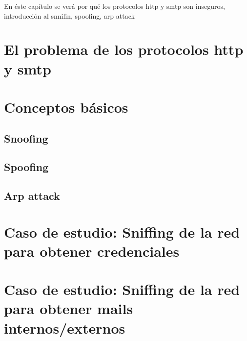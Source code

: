 
En éste capítulo se verá por qué los protocolos http y smtp son inseguros, introducción al snnifin, spoofing, arp attack

\section{El problema de los protocolos http y smtp}
\section{Conceptos básicos}
\subsection{Snoofing}
\subsection{Spoofing}
\subsection{Arp attack}
\section{Caso de estudio: Sniffing de la red para obtener credenciales}
\section{Caso de estudio: Sniffing de la red para obtener mails internos/externos}


